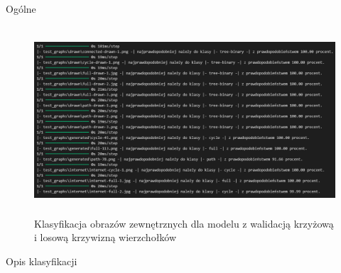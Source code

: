 Ogólne %

\begin{figure}[ht]
	\centering
	\includegraphics[height=7cm]{resources/tests/images/v4/multiple_edges_crossvalid_upgraded_txt.png}
	\caption{Klasyfikacja obrazów zewnętrznych dla modelu z walidacją krzyżową i losową krzywizną wierzchołków}
	\label{Fig:tests-var-2}
\end{figure}
\FloatBarrier

Opis klasyfikacji %